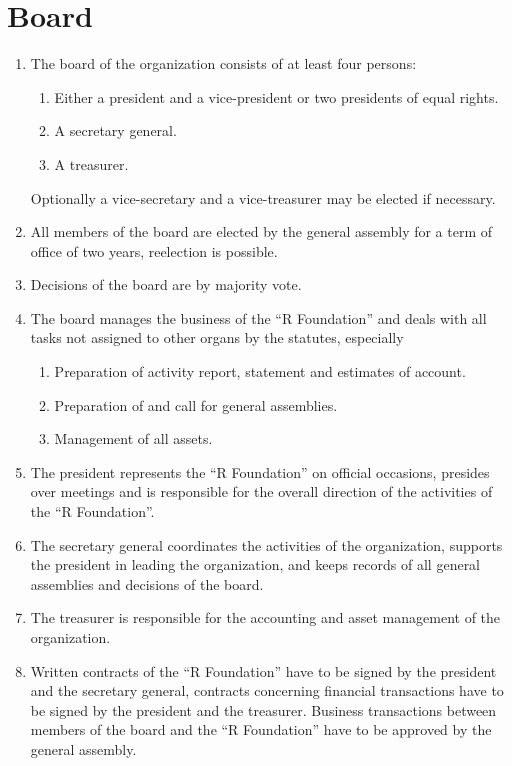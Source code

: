 \documentclass[a4paper]{article}
\newcommand{\RF}{``R Foundation''}
\begin{document}
\section{Board}

\begin{enumerate}
  \item
   The board of the organization consists of at least four
   persons:
   \begin{enumerate}
    \item Either a president and a vice-president or two presidents of
     equal rights.
    \item A secretary general.
    \item A treasurer.
   \end{enumerate}
   Optionally a vice-secretary and a vice-treasurer may be elected if
   necessary.
   
  \item All members of the board are elected by the general assembly
   for a term of office of two years, reelection is possible.
   
  \item Decisions of the board are by majority vote.
   
  \item The board manages the business of the \RF{} and deals with all
   tasks not assigned to other organs by the statutes, especially
   \begin{enumerate}
    \item Preparation of activity report, statement and estimates of
     account.
    \item Preparation of and call for general assemblies.
    \item Management of all assets.
  \end{enumerate}
  
 \item The president represents the \RF{} on official occasions,
  presides over meetings and is responsible for the overall direction
  of the activities of the \RF{}.
  
 \item The secretary general coordinates the activities of the
  organization, supports the president in leading the organization,
  and keeps records of all general assemblies and decisions of the
  board.
  
 \item The treasurer is responsible for the accounting and asset
  management of the organization.
  
 \item Written contracts of the \RF{} have to be signed by the
  president and the secretary general, contracts concerning financial
  transactions have to be signed by the president and the
  treasurer. Business transactions between members of the board and the
  \RF{} have to be approved by the general assembly.
\end{enumerate}
\end{document}
